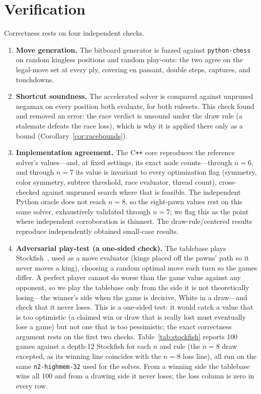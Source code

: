 \documentclass[11pt]{article}
\theoremstyle{plain}
\theoremstyle{definition}
\begin{document}
\section{Verification}\label{sec:verify}

Correctness rests on four independent checks.

\begin{enumerate}
  \item \textbf{Move generation.} The bitboard generator is fuzzed against
  \texttt{python-chess} on random kingless positions and random play-outs: the
  two agree on the legal-move set at every ply, covering en passant, double
  steps, captures, and touchdowns.
  \item \textbf{Shortcut soundness.} The accelerated solver is compared against
  unpruned negamax on every position both evaluate, for both rulesets. This
  check found and removed an error: the race verdict is unsound under the draw
  rule (a stalemate defeats the race loss), which is why it is applied there only
  as a bound (Corollary~\ref{cor:racebounds}).
  \item \textbf{Implementation agreement.} The C\texttt{++} core reproduces the
  reference solver's values---and, at fixed settings, its exact node counts---through
  $n=6$, and through $n=7$ its value is invariant to every optimization flag
  (symmetry, color symmetry, subtree threshold, race evaluator, thread count),
  cross-checked against unpruned search where that is feasible. The independent
  Python oracle does not reach $n=8$, so the eight-pawn values rest on this same
  solver, exhaustively validated through $n=7$; we flag this as the point where
  independent corroboration is thinnest. The draw-rule/centered results reproduce
  independently obtained small-case results.
  \item \textbf{Adversarial play-test (a one-sided check).} The tablebase plays
  Stockfish~\cite{stockfish}, used as a move evaluator (kings placed off the pawns'
  path so it never moves a king), choosing a random optimal move each turn so the
  games differ. A perfect player cannot do worse than the game value against any
  opponent, so we play the tablebase only from the side it is not theoretically
  losing---the winner's side when the game is decisive, White in a draw---and check
  that it never loses. This is a one-sided test: it would catch a value that is too
  optimistic (a claimed win or draw that is really lost must eventually lose a game)
  but not one that is too pessimistic; the exact correctness argument rests on the
  first two checks. Table~\ref{tab:stockfish} reports 100 games against a depth-12
  Stockfish for each $n$ and rule (the $n=8$ draw excepted, as its winning line
  coincides with the $n=8$ loss line), all run on the same \texttt{n2-highmem-32}
  used for the solves. From a winning side the tablebase wins all 100 and from a
  drawing side it never loses; the loss column is zero in every row.
\end{enumerate}
\end{document}
